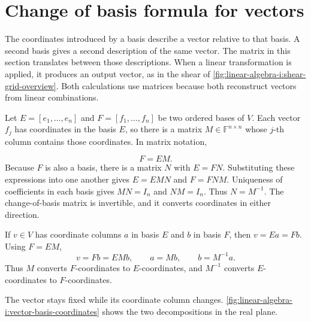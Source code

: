 \section{Change of basis formula for vectors}
\label{sec:linear-algebra-i:change-of-basis-for-vectors}

The coordinates introduced by a basis describe a vector relative to that
basis. A second basis gives a second description of the same vector.
The matrix in this section translates between those descriptions. When a
linear transformation is applied, it produces an output vector,
as in the shear of
\autoref{fig:linear-algebra-i:shear-grid-overview}. Both calculations use
matrices because both reconstruct vectors from linear combinations.

Let \(E=[e_1,\ldots,e_n]\) and \(F=[f_1,\ldots,f_n]\) be two ordered
bases of \(V\). Each vector \(f_j\) has coordinates in the basis \(E\),
so there is a matrix \(M\in\mathbb F^{n\times n}\) whose \(j\)-th column
contains those coordinates. In matrix notation,
\begin{marginfigure}
  \centering
  
  \caption[One vector in two bases]{The same vector \(v\) in two bases
    of the real plane, shown schematically. Dashed lines complete the
    components. The coordinates satisfy \(a=Mb\) when \(F=EM\).}
  \label{fig:linear-algebra-i:vector-basis-coordinates}
\end{marginfigure}
\[
  F=EM.
\]
Because \(F\) is also a basis, there is a matrix \(N\) with \(E=FN\).
Substituting these expressions into one another gives
\(E=EMN\) and \(F=FNM\). Uniqueness of coefficients in each basis
gives \(MN=I_n\) and \(NM=I_n\). Thus \(N=M^{-1}\). The change-of-basis
matrix is invertible, and it converts coordinates in either direction.

If \(v\in V\) has coordinate columns \(a\) in basis \(E\) and \(b\) in
basis \(F\), then \(v=Ea=Fb\). Using \(F=EM\),
\[
  v=Fb=EMb,
  \qquad a=Mb,
  \qquad b=M^{-1}a.
\]
Thus \(M\) converts \(F\)-coordinates to \(E\)-coordinates, and
\(M^{-1}\) converts \(E\)-coordinates to \(F\)-coordinates.

The vector stays fixed while its coordinate column changes.
\autoref{fig:linear-algebra-i:vector-basis-coordinates} shows the two
decompositions in the real plane.
